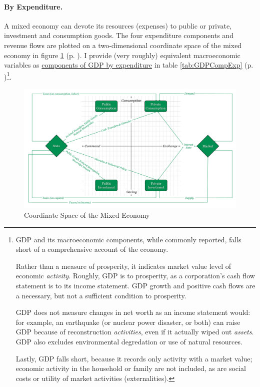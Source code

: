 \paragraph[By Expenditure]{By Expenditure.}  \label{sec:byexpenditure}
A mixed economy can devote its resources (expenses) to public or private, investment and consumption goods. The four expenditure components and revenue flows are plotted on a two-dimensional coordinate space of the mixed economy in figure \ref{fig:coordinate-space} (p. \pageref{fig:coordinate-space}). I provide (very roughly) equivalent macroeconomic variables as \hyperref[tab:GDPCompExp]{components of GDP by expenditure} in table \ref{tab:GDPCompExp} (p. \pageref{tab:GDPCompExp})\footnote{
	\gls{GDP} and its macroeconomic components, while commonly reported, falls short of a comprehensive account of the economy. 
	
	Rather than a measure of prosperity, it indicates market value level of economic \emph{activity}. Roughly, \gls{GDP} is to prosperity, as a corporation's cash flow statement is to its income statement. \gls{GDP} growth and positive cash flows are a necessary, but not a sufficient condition to prosperity. 
	
	\gls{GDP} does not measure changes in net worth as an income statement would: for example, an earthquake (or nuclear power disaster, or both) can raise \gls{GDP} because of reconstruction \emph{activities}, even if it actually wiped out \emph{assets}. \gls{GDP} also excludes environmental degredation or use of natural resources.
	
	Lastly, \gls{GDP} falls short, because it records only activity with a market value; economic activity in the household or family are not included, as are social costs or utility of market activities (externalities).}.
	
\begin{landscape}
 \begin{figure}[htbp]
	\centering
	\includegraphics[width=1\linewidth]{./img/coordinate-space}  
	\caption{Coordinate Space of the Mixed Economy}
	\label{fig:coordinate-space}
\end{figure} %
\end{landscape}

